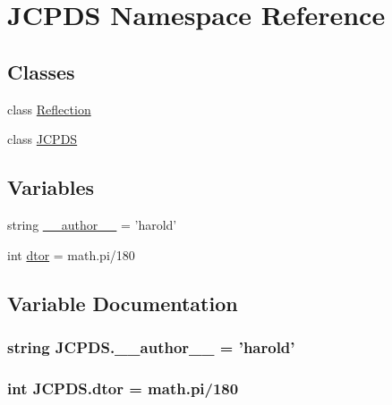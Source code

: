 \hypertarget{namespace_j_c_p_d_s}{\section{J\-C\-P\-D\-S Namespace Reference}
\label{namespace_j_c_p_d_s}
}
\subsection*{Classes}
\begin{DoxyCompactItemize}
\item 
class \hyperlink{class_j_c_p_d_s_1_1_reflection}{Reflection}
\item 
class \hyperlink{class_j_c_p_d_s_1_1_j_c_p_d_s}{J\-C\-P\-D\-S}
\end{DoxyCompactItemize}
\subsection*{Variables}
\begin{DoxyCompactItemize}
\item 
string \hyperlink{namespace_j_c_p_d_s_a67b5c176aa3482aa139a8d8bf701a897}{\-\_\-\-\_\-author\-\_\-\-\_\-} = 'harold'
\item 
int \hyperlink{namespace_j_c_p_d_s_a8db23d14be42fee4d5f6e1155dc98ee3}{dtor} = math.\-pi/180
\end{DoxyCompactItemize}


\subsection{Variable Documentation}
\hypertarget{namespace_j_c_p_d_s_a67b5c176aa3482aa139a8d8bf701a897}{
\subsubsection[{\-\_\-\-\_\-author\-\_\-\-\_\-}]{\setlength{\rightskip}{0pt plus 5cm}string J\-C\-P\-D\-S.\-\_\-\-\_\-author\-\_\-\-\_\- = 'harold'}}\label{namespace_j_c_p_d_s_a67b5c176aa3482aa139a8d8bf701a897}
\hypertarget{namespace_j_c_p_d_s_a8db23d14be42fee4d5f6e1155dc98ee3}{
\subsubsection[{dtor}]{\setlength{\rightskip}{0pt plus 5cm}int J\-C\-P\-D\-S.\-dtor = math.\-pi/180}}\label{namespace_j_c_p_d_s_a8db23d14be42fee4d5f6e1155dc98ee3}
